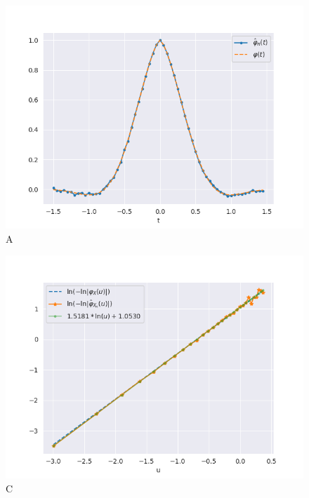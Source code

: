 \documentclass{article}
\begin{document}
		\begin{figure}[H]
				\centering
				\includegraphics[width=1\linewidth]{images/stable_CF.png}
			\caption{A}\label{stable_cdf}
		\end{figure}

		\begin{figure}[H]
			\centering
			\includegraphics[width=1\linewidth]{images/compare_cf.png}
			\caption{C}\label{tails1}
		\end{figure}
\end{document}
